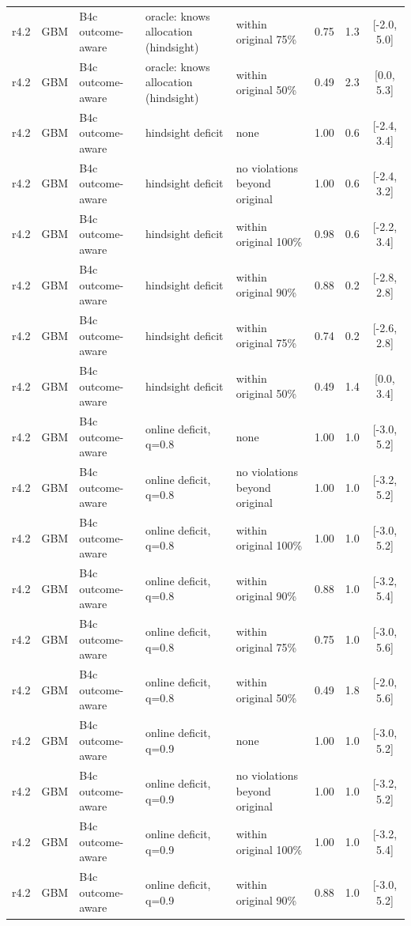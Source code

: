 \begin{longtable}{lllp{4.2cm}p{3.4cm}ccc}
r4.2 & GBM & B4c outcome-aware & oracle: knows allocation (hindsight) & within original 75\% & 0.75 & 1.3 & [-2.0, 5.0] \\
r4.2 & GBM & B4c outcome-aware & oracle: knows allocation (hindsight) & within original 50\% & 0.49 & 2.3 & [0.0, 5.3] \\
r4.2 & GBM & B4c outcome-aware & hindsight deficit & none & 1.00 & 0.6 & [-2.4, 3.4] \\
r4.2 & GBM & B4c outcome-aware & hindsight deficit & no violations beyond original & 1.00 & 0.6 & [-2.4, 3.2] \\
r4.2 & GBM & B4c outcome-aware & hindsight deficit & within original 100\% & 0.98 & 0.6 & [-2.2, 3.4] \\
r4.2 & GBM & B4c outcome-aware & hindsight deficit & within original 90\% & 0.88 & 0.2 & [-2.8, 2.8] \\
r4.2 & GBM & B4c outcome-aware & hindsight deficit & within original 75\% & 0.74 & 0.2 & [-2.6, 2.8] \\
r4.2 & GBM & B4c outcome-aware & hindsight deficit & within original 50\% & 0.49 & 1.4 & [0.0, 3.4] \\
r4.2 & GBM & B4c outcome-aware & online deficit, q=0.8 & none & 1.00 & 1.0 & [-3.0, 5.2] \\
r4.2 & GBM & B4c outcome-aware & online deficit, q=0.8 & no violations beyond original & 1.00 & 1.0 & [-3.2, 5.2] \\
r4.2 & GBM & B4c outcome-aware & online deficit, q=0.8 & within original 100\% & 1.00 & 1.0 & [-3.0, 5.2] \\
r4.2 & GBM & B4c outcome-aware & online deficit, q=0.8 & within original 90\% & 0.88 & 1.0 & [-3.2, 5.4] \\
r4.2 & GBM & B4c outcome-aware & online deficit, q=0.8 & within original 75\% & 0.75 & 1.0 & [-3.0, 5.6] \\
r4.2 & GBM & B4c outcome-aware & online deficit, q=0.8 & within original 50\% & 0.49 & 1.8 & [-2.0, 5.6] \\
r4.2 & GBM & B4c outcome-aware & online deficit, q=0.9 & none & 1.00 & 1.0 & [-3.0, 5.2] \\
r4.2 & GBM & B4c outcome-aware & online deficit, q=0.9 & no violations beyond original & 1.00 & 1.0 & [-3.2, 5.2] \\
r4.2 & GBM & B4c outcome-aware & online deficit, q=0.9 & within original 100\% & 1.00 & 1.0 & [-3.2, 5.4] \\
r4.2 & GBM & B4c outcome-aware & online deficit, q=0.9 & within original 90\% & 0.88 & 1.0 & [-3.0, 5.2] \\

\end{longtable}

